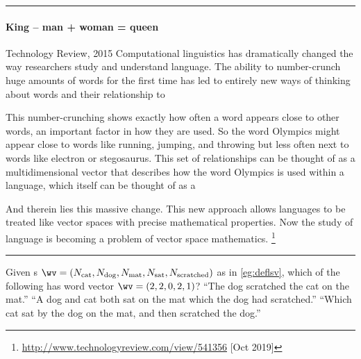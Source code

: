 \begin{table}
\hrule\smallskip
\begin{minipage}{\linewidth}
\paragraph{King -- man + woman = queen}
\begin{quoted}{Technology Review, 2015}
Computational linguistics has dramatically changed the way researchers study and understand language. 
The ability to number-crunch huge amounts of words for the first time has led to entirely new ways of thinking about words and their relationship to 

This number-crunching shows exactly how often a word appears close to other words, an important factor in how they are used. 
So the word Olympics might appear close to words like running, jumping, and throwing but less often next to words like electron or stegosaurus.  
This set of relationships can be thought of as a multidimensional vector that describes how the word Olympics is used within a language, which itself can be thought of as a 

And therein lies this massive change. 
This new approach allows languages to be treated like vector spaces with precise mathematical properties. 
Now the study of language is becoming a problem of vector space mathematics.
\footnote{\url{http://www.technologyreview.com/view/541356} [Oct 2019]}
\end{quoted}
\end{minipage}
\hrule
\end{table}




\begin{activity}
Given s \(\sloppy\wv=(N_{\text{cat}}, N_{\text{dog}}, N_{\text{mat}}, N_{\text{sat}}, N_{\text{scratched}})\) as in \cref{eg:deflsv},
which of the following has word vector \(\wv=(2,2,0,2,1)\)?
{``The dog scratched the cat on the mat.''}
{``A dog and cat both sat on the mat which the dog had scratched.''}
{``Which cat sat by the dog on the mat, and then scratched the dog.''}
\end{activity}







